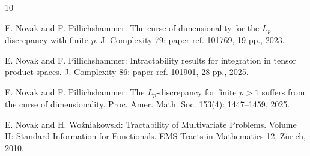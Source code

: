 \documentclass[12pt]{article}
\theoremstyle{remark}
\theoremstyle{definition}
\newcommand{\<}{\langle}
\renewcommand{\>}{\rangle}
\begin{document}
\begin{thebibliography}{10}
 

 E. Novak and F. Pillichshammer: The curse of dimensionality for the $L_p$-discrepancy with finite $p$. J. Complexity 79: paper ref. 101769, 19 pp., 2023.

 E. Novak and F. Pillichshammer: Intractability results for integration in tensor product spaces. J. Complexity 86: paper ref. 101901, 28 pp., 2025.

 E. Novak and F. Pillichshammer: The $L_p$-discrepancy for finite $p>1$ suffers from the curse of dimensionality. Proc. Amer. Math. Soc. 153(4): 1447--1459, 2025.




 E. Novak and H. Wo\'{z}niakowski: Tractability of Multivariate Problems. Volume II: Standard Information for Functionals. EMS Tracts in Mathematics 12, Z\"urich, 2010.







\end{thebibliography}
\end{document}
